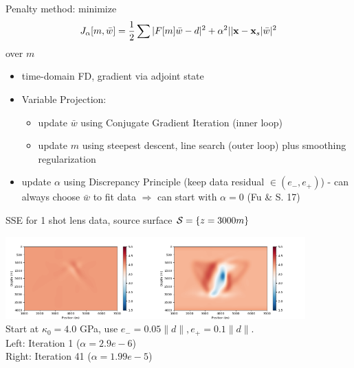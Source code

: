 \documentclass[xcolor=dvipsnames,12pt,aspectratio=169]{beamer}
\begin{document}
\begin{frame}
Penalty method: minimize
\[
J_{\alpha}[m,\bar{w}] = \frac{1}{2} \sum |F[m]\bar{w} - d|^2 + \alpha^2||\mathbf{x}-\mathbf{x}_s|\bar{w}|^2
\]
over $m$ 

\begin{itemize}
\item time-domain FD, gradient via adjoint state
\item Variable Projection:
  \begin{itemize}
  \item update $\bar{w}$ using Conjugate Gradient Iteration (inner loop)
\item update $m$ using steepest descent, line search (outer loop) plus
  smoothing regularization
  \end{itemize}
\item update $\alpha$ using Discrepancy Principle (keep data residual $\in (e_-, e_+)$) - {\color{blue} can always choose $\bar{w}$ to fit data} $\Rightarrow$ can start with $\alpha=0$ (Fu \& S. 17)
\end{itemize}
\end{frame}

\begin{frame}
\begin{center}
SSE for 1 shot lens data, source surface ${\cal S} = \{z = 3000 m\}$
\end{center}
\begin{center}
\includegraphics[height=1.25in]{Fig/cgw1_bulkupdlh0.png}\includegraphics[height=1.25in]{Fig/cgw41_bulkupdlh0.png}\\
\vspace{0.25in}
Start at $\kappa_0=4.0$ GPa, use $e_-=0.05\|d\|, e_+=0.1\|d\|$. \\
Left: Iteration 1 ($\alpha=2.9 e-6$)\\
Right: Iteration 41 ($\alpha = 1.99 e-5$)
\end{center}
\end{frame}
\end{document}

